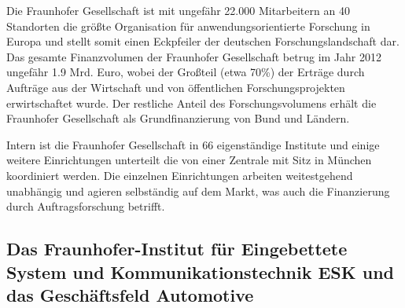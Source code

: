 \documentclass[a4paper]{scrartcl}
\begin{document}
Die Fraunhofer Gesellschaft ist mit ungefähr 22.000 Mitarbeitern an 40 Standorten die größte Organisation für anwendungsorientierte Forschung in Europa und stellt somit einen Eckpfeiler der deutschen Forschungslandschaft dar. 
Das gesamte Finanzvolumen der Fraunhofer Gesellschaft betrug im Jahr 2012  ungefähr 1.9 Mrd. Euro, wobei der Großteil (etwa 70\%) der Erträge durch Aufträge aus der Wirtschaft und von öffentlichen Forschungsprojekten erwirtschaftet wurde. Der restliche Anteil des Forschungsvolumens erhält die Fraunhofer Gesellschaft als Grundfinanzierung von Bund und Ländern. 

Intern ist die Fraunhofer Gesellschaft in 66 eigenständige Institute und einige weitere Einrichtungen unterteilt die von einer Zentrale mit Sitz in München koordiniert werden. Die einzelnen Einrichtungen arbeiten weitestgehend unabhängig und agieren selbständig auf dem Markt, was auch die Finanzierung durch Auftragsforschung betrifft. 


\subsection{Das Fraunhofer-Institut für Eingebettete System und Kommunikationstechnik ESK und das Geschäftsfeld Automotive} 
\label{sec:das-fraunh-inst}
\end{document}
